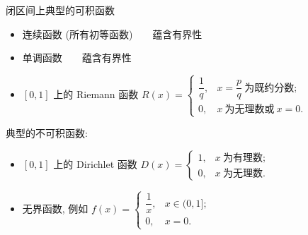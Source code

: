 \begin{frame}{闭区间上典型的可积函数}

\begin{itemize}
\item 连续函数 (所有初等函数) ~  ~ 蕴含有界性\
\pause
\item 单调函数 ~  ~ 蕴含有界性
\pause
\item $[0, 1]$ 上的 Riemann 函数 $R(x) = \begin{cases}
  \dfrac{1}{q}, & x = \dfrac{p}{q} ~ \text{为既约分数;}\\
  0, & x ~ \text{为无理数或} ~ x = 0.
\end{cases}$
\end{itemize}

\pause
\vspace{1em}

典型的不可积函数:
\pause

\begin{itemize}[<+->]
\item $[0, 1]$ 上的 Dirichlet 函数 $D(x) = \begin{cases}
  1, & x ~ \text{为有理数;}\\
  0, & x ~ \text{为无理数.}
\end{cases}$
\item 无界函数, 例如 $f(x) = \begin{cases}
  \dfrac{1}{x}, & x \in (0, 1];\\
  0, & x = 0.
\end{cases}$
\end{itemize}

\end{frame}


